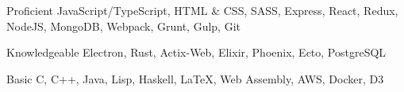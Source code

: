 

\begin{cvskills}

  \cvskill
    {Proficient} %
    {JavaScript/TypeScript, HTML \& CSS, SASS, Express, React, Redux, NodeJS, MongoDB, Webpack, Grunt, Gulp, Git} %

  \cvskill
    {Knowledgeable} %
    {Electron, Rust, Actix-Web, Elixir, Phoenix, Ecto, PostgreSQL} %

  \cvskill
    {Basic} %
    {C, C++, Java, Lisp, Haskell, \LaTeX, Web Assembly, AWS, Docker, D3} %

\end{cvskills}
